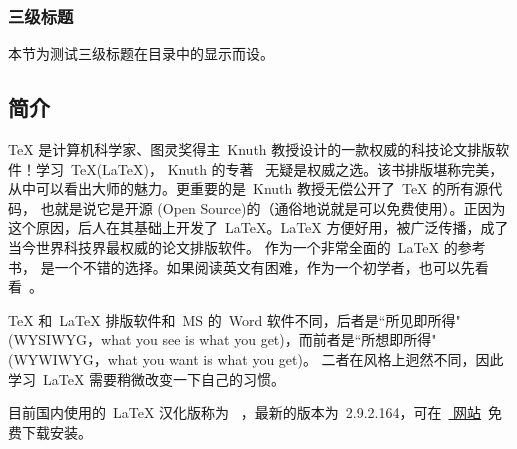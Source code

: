 \subsubsection{三级标题}
本节为测试三级标题在目录中的显示而设。
\subsection{\CTeX{} 简介}
\TeX{} 是计算机科学家、图灵奖得主~Knuth 教授设计的一款权威的科技论文排版软件！学习~\TeX(\LaTeX)，
Knuth 的专著~\cite{knuth} 无疑是权威之选。该书排版堪称完美，从中可以看出大师的魅力。更重要的是~Knuth 教授无偿公开了~\TeX{} 的所有源代码，
也就是说它是开源 (Open Source)的（通俗地说就是可以免费使用）。正因为这个原因，后人在其基础上开发了~\LaTeX 。\LaTeX{} 方便好用，被广泛传播，成了当今世界科技界最权威的论文排版软件。
作为一个非常全面的~\LaTeX{} 的参考书，\cite{companion} 是一个不错的选择。如果阅读英文有困难，作为一个初学者，也可以先看看~\cite{zhanglibo}。

\TeX{} 和~\LaTeX{} 排版软件和~MS 的~Word 软件不同，后者是``所见即所得"(WYSIWYG，what you see is what you get)，而前者是``所想即所得"(WYWIWYG，what you want is what you get)。
二者在风格上迥然不同，因此学习~\LaTeX{} 需要稍微改变一下自己的习惯。

目前国内使用的~\LaTeX{} 汉化版称为~
\CTeX ，最新的版本为~2.9.2.164，可在~\href{http://www.ctex.org/HomePage}{\CTeX{} 网站}~免费下载安装。
